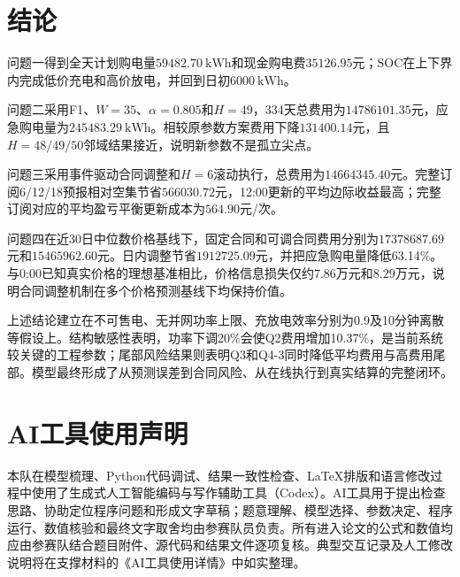 \documentclass[UTF8,12pt,a4paper]{ctexart}
\theoremstyle{remark}
\begin{document}
\section{结论}
问题一得到全天计划购电量$59482.70\ \mathrm{kWh}$和现金购电费$35126.95$元；SOC在上下界内完成低价充电和高价放电，并回到日初$6000\ \mathrm{kWh}$。

问题二采用F1、$W=35$、$\alpha=0.805$和$H=49$，334天总费用为$14786101.35$元，应急购电量为$245483.29\ \mathrm{kWh}$。相较原参数方案费用下降$131400.14$元，且$H=48/49/50$邻域结果接近，说明新参数不是孤立尖点。

问题三采用事件驱动合同调整和$H=6$滚动执行，总费用为$14664345.40$元。完整订阅6/12/18预报相对空集节省$566030.72$元，12:00更新的平均边际收益最高；完整订阅对应的平均盈亏平衡更新成本为$564.90$元/次。

问题四在近30日中位数价格基线下，固定合同和可调合同费用分别为$17378687.69$元和$15465962.60$元。日内调整节省$1912725.09$元，并把应急购电量降低63.14\%。与0:00已知真实价格的理想基准相比，价格信息损失仅约$7.86$万元和$8.29$万元，说明合同调整机制在多个价格预测基线下均保持价值。

上述结论建立在不可售电、无并网功率上限、充放电效率分别为0.9及10分钟离散等假设上。结构敏感性表明，功率下调20\%会使Q2费用增加10.37\%，是当前系统较关键的工程参数；尾部风险结果则表明Q3和Q4-3同时降低平均费用与高费用尾部。模型最终形成了从预测误差到合同风险、从在线执行到真实结算的完整闭环。

\clearpage
\section*{AI工具使用声明}
本队在模型梳理、Python代码调试、结果一致性检查、LaTeX排版和语言修改过程中使用了生成式人工智能编码与写作辅助工具（Codex）。AI工具用于提出检查思路、协助定位程序问题和形成文字草稿；题意理解、模型选择、参数决定、程序运行、数值核验和最终文字取舍均由参赛队员负责。所有进入论文的公式和数值均应由参赛队结合题目附件、源代码和结果文件逐项复核。典型交互记录及人工修改说明将在支撑材料的《AI工具使用详情》中如实整理。



\clearpage\appendix
\end{document}
